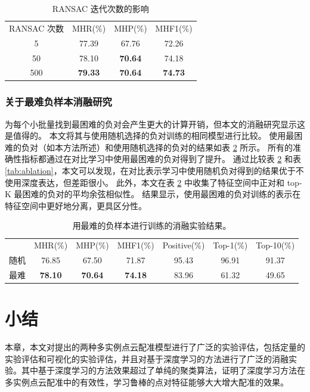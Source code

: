 \begin{table}
  \caption{
        RANSAC 迭代次数的影响
  }
  \centering
  \begin{tabular}{cccc}
    \hline\noalign{\smallskip}
    RANSAC 次数 & MHR(\%)         & MHP(\%)         & MHF1(\%)          \\
  \noalign{\smallskip}
  \hline
  \noalign{\smallskip}
  5   & 77.39          & 67.76          & 72.26              \\
  50  & 78.10          & \textbf{70.64} & 74.18                \\
  500 & \textbf{79.33} & \textbf{70.64} & \textbf{74.73}  \\  
  \hline
  \end{tabular}
  \label{tab:ransac}
\end{table}

\subsubsection{关于最难负样本消融研究}
\vspace{-0.3cm}
为每个小批量找到最困难的负对会产生更大的计算开销，但本文的消融研究显示这是值得的。
本文将其与使用随机选择的负对训练的相同模型进行比较。
使用最困难的负对（如本方法所述）和使用随机选择的负对的结果如表 \ref{tab:hardest} 所示。
所有的准确性指标都通过在对比学习中使用最困难的负对得到了提升。
通过比较表 \ref{tab:hardest} 和表 \ref{tab:ablation}，本文可以发现，在对比表示学习中使用随机负对得到的结果优于不使用深度表达，但差距很小。
此外，本文在表 \ref{tab:hardest} 中收集了特征空间中正对和 top-K 最困难的负对的平均余弦相似性。
结果显示，使用最困难的负对训练的表示在特征空间中更好地分离，更具区分性。

\begin{table}
  \caption{
        用最难的负样本进行训练的消融实验结果。
  }
  \centering
  \begin{tabular}{ccccccc}
    \hline\noalign{\smallskip}
    & MHR(\%) & MHP(\%) & MHF1(\%) & Positive(\%) & Top-1(\%) & Top-10(\%) \\
    \noalign{\smallskip}
    \hline
    \noalign{\smallskip}
    随机  & 76.85  & 67.50  & 71.87  & 95.43 & 96.91 & 91.37  \\
    最难 & \textbf{78.10} & \textbf{70.64} & \textbf{74.18} & 83.96 & 61.32 & 49.65 \\  
    \hline
  \end{tabular}
  \label{tab:hardest}
\end{table}


\section{小结}
本章，本文对提出的两种多实例点云配准模型进行了广泛的实验评估，包括定量的实验评估和可视化的实验评估，并且对基于深度学习的方法进行了广泛的消融实验。其中基于深度学习的方法效果超过了单纯的聚类算法，证明了深度学习方法在多实例点云配准中的有效性，学习鲁棒的点对特征能够大大增大配准的效果。